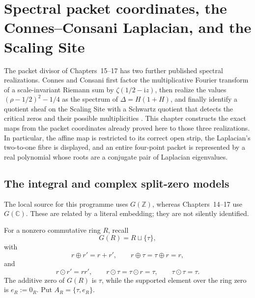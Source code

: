 \section{Spectral packet coordinates, the Connes--Consani Laplacian, and the Scaling Site}
\label{sec:spectral-packet-coordinates}

The packet divisor of Chapters~15--17 has two further published spectral
realizations.  Connes and Consani first factor the multiplicative Fourier
transform of a scale-invariant Riemann sum by
\(\zeta(1/2-\mathrm iz)\), then realize the values
\((\rho-1/2)^2-1/4\) as the spectrum of
\(\Delta=H(1+H)\), and finally identify a quotient sheaf on the Scaling Site
with a Schwartz quotient that detects the critical zeros and their possible
multiplicities
\cite[Eq.~(2.2), Prop.~4.2, and the theorem on pp.~96--98]{connesConsani2023Hochschild}.
This chapter constructs the exact maps from the packet coordinates already
proved here to those three realizations.  In particular, the affine map is
restricted to its correct open strip, the Laplacian's two-to-one fibre is
displayed, and an entire four-point packet is represented by a real polynomial
whose roots are a conjugate pair of Laplacian eigenvalues.

\subsection{The integral and complex split-zero models}

The local source for this programme uses \(G(\mathbb Z)\), whereas
Chapters~14--17 use \(G(\mathbb C)\).  These are related by a literal
embedding; they are not silently identified.

For a nonzero commutative ring \(R\), recall
\[
 G(R)=R\sqcup\{\tau\},
\]
with
\[
 r\oplus r'=r+r',\qquad r\oplus\tau=\tau\oplus r=r,
\]
and
\[
 r\odot r'=rr',\qquad r\odot\tau=\tau\odot r=\tau,
 \qquad \tau\odot\tau=\tau.
\]
The additive zero of \(G(R)\) is \(\tau\), while the supported element over
the ring zero is \(e_R:=0_R\).  Put
\(A_R=\{\tau,e_R\}\).

